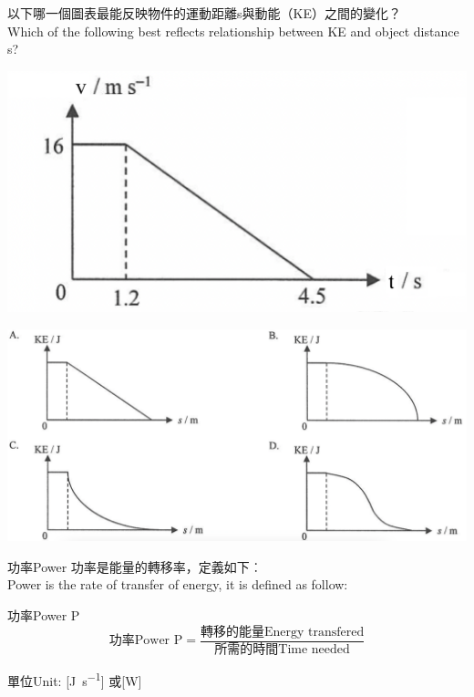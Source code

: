 \documentclass[beamer=true]{standalone}
\begin{document}
\begin{frame}{}
    以下哪一個圖表最能反映物件的運動距離s與動能（KE）之間的變化？\\Which of the following best reflects relationship between KE and object distance s?
    {\par\centering
    \includegraphics[width=.3\textwidth]{assets/59346db9.png}
    \par}
    {\par\centering
    \includegraphics[width=.6\textwidth]{assets/fed589c5.png}
    \par}
\end{frame}


\begin{frame}{功率Power}
    功率是能量的轉移率，定義如下︰\\Power is the rate of transfer of energy, it is defined as follow:
    \begin{alertblock}
        {功率Power P}
        \begin{equation}
            \textrm{功率Power P}=\frac{\textrm{轉移的能量Energy transfered}}{\textrm{所需的時間Time needed}}
        \end{equation}
    \end{alertblock}
    單位Unit: [\unit{J.s^{-1}}] 或[W]
\end{frame}


\end{document}
